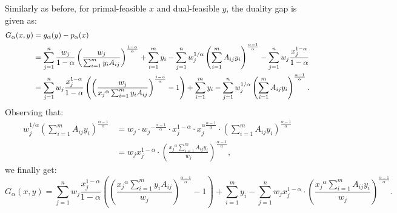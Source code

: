 \documentclass[11pt]{article}
\begin{document}
Similarly as before, for primal-feasible $x$ and dual-feasible $y$, the duality gap is given as:
\begin{align}
G_{\alpha}(x, y) &= g_{\alpha}(y) - p_{\alpha}(x)\notag\\
&= \sum_{j=1}^n \frac{w_j}{1-\alpha}\left(\frac{w_j}{\sum_{i=1}^m y_i A_{ij}}\right)^{\frac{1-\alpha}{\alpha}}+\sum_{i=1}^m y_i - \sum_{j=1}^n w_j^{1/\alpha}\left(\sum_{i=1}^m A_{ij}y_i\right)^{\frac{\alpha-1}{\alpha}} - \sum_{j=1}^n w_j\frac{x_j^{1-\alpha}}{1-\alpha}\notag\\
&= \sum_{j=1}^n w_j\frac{x_j^{1-\alpha}}{1-\alpha}\left(\left(\frac{w_j}{{x_j}^{\alpha}\sum_{i=1}^m y_i A_{ij}}\right)^{\frac{1-\alpha}{\alpha}}-1\right) +\sum_{i=1}^m y_i - \sum_{j=1}^n w_j^{1/\alpha}\left(\sum_{i=1}^m A_{ij}y_i\right)^{\frac{\alpha-1}{\alpha}}.\notag
\end{align}
Observing that:
\begin{align*}
w_j^{1/\alpha}\left(\sum_{i=1}^m A_{ij}y_i\right)^{\frac{\alpha-1}{\alpha}} &= w_j\cdot {w_j}^{-\frac{\alpha-1}{\alpha}}\cdot x_j^{1-\alpha}\cdot x_j^{\alpha\frac{\alpha-1}{\alpha}}\cdot \left(\sum_{i=1}^m A_{ij}y_i\right)^{\frac{\alpha-1}{\alpha}}\\
&= w_j x_j^{1-\alpha}\cdot \left(\frac{{x_j}^{\alpha}\sum_{i=1}^m A_{ij}y_i}{w_j}\right)^{\frac{\alpha-1}{\alpha}},
\end{align*}
we finally get:
\begin{equation*}
G_{\alpha}(x, y)=\sum_{j=1}^n w_j\frac{x_j^{1-\alpha}}{1-\alpha}\left(\left(\frac{{x_j}^{\alpha}\sum_{i=1}^m y_i A_{ij}}{w_j}\right)^{\frac{\alpha-1}{\alpha}}-1\right) +\sum_{i=1}^m y_i - \sum_{j=1}^n  w_j x_j^{1-\alpha}\cdot \left(\frac{{x_j}^{\alpha}\sum_{i=1}^m A_{ij}y_i}{w_j}\right)^{\frac{\alpha-1}{\alpha}}.
\end{equation*}







































\fi
\end{document}
